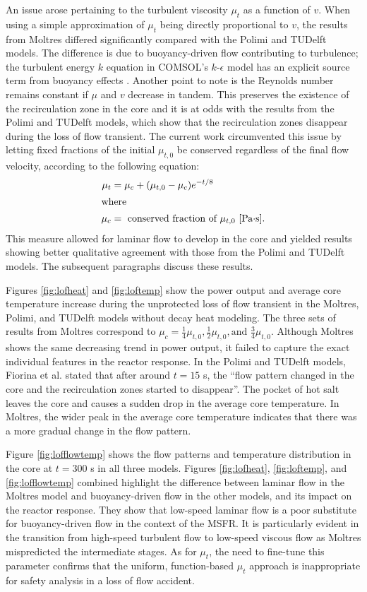 An issue arose pertaining to the turbulent viscosity $\mu_t$ as a function of
$v$. When using a simple approximation of $\mu_t$ being directly proportional
to $v$, the results from Moltres differed significantly compared with the
Polimi and TUDelft models. The difference is due to buoyancy-driven flow
contributing to turbulence; the turbulent energy $k$ equation in COMSOL's
$k$-$\epsilon$ model has an explicit source term from buoyancy effects
\cite{comsol_ab_comsol_2018}. Another point to note is the
Reynolds number remains constant if $\mu$ and $v$ decrease in tandem. This
preserves the existence of the recirculation zone in the core and it is at
odds with the results from the Polimi and TUDelft models, which show that the
recirculation zones disappear during the loss of flow transient. The current
work circumvented this issue by letting fixed fractions of the initial
$\mu_{t,0}$ be conserved regardless of the final flow velocity, according to
the following equation:
%
\begin{align}
    \mu_t &= \mu_c + (\mu_{t,0} - \mu_c) e^{-t/8} \label{lofmu} \\
    \intertext{where}
    \mu_c &= \text{ conserved fraction of $\mu_{t,0}$ [Pa$\cdot$s].} \nonumber
\end{align}
%
This measure allowed for laminar flow to develop in the core and yielded
results showing better qualitative agreement with those from the Polimi and
TUDelft models. The subsequent paragraphs discuss these results.

Figures \ref{fig:lofheat} and \ref{fig:loftemp} show the power output and
average core temperature increase during the unprotected loss of flow
transient in the Moltres, Polimi, and TUDelft models without decay heat
modeling. The three sets of results from Moltres correspond to $\mu_c =
\frac{1}{4} \mu_{t,0}, \frac{1}{2} \mu_{t,0}, \text{and } \frac{3}{4}
\mu_{t,0}$.
Although Moltres shows the same decreasing trend in power output, it failed to
capture the exact individual features in the reactor response. In the Polimi 
and TUDelft models, Fiorina et al. \cite{fiorina_modelling_2014}
stated that after around $t=15$ s, the ``flow pattern changed in the core and
the recirculation zones started to disappear''. The pocket of hot salt leaves
the core and causes a sudden drop in the average core temperature. In Moltres,
the wider peak in the average core temperature
indicates that there was a more gradual change in the flow pattern.

Figure \ref{fig:lofflowtemp} shows the flow patterns and temperature
distribution in the core at $t=300$ s in all three models. Figures
\ref{fig:lofheat}, \ref{fig:loftemp}, and \ref{fig:lofflowtemp} combined
highlight the difference between laminar flow in the Moltres model and
buoyancy-driven flow in the other models, and its impact on the reactor
response. They show that low-speed laminar flow is a poor substitute for
buoyancy-driven flow in the context of the MSFR. It is particularly evident
in the transition from high-speed turbulent flow to low-speed viscous
flow as Moltres mispredicted the intermediate stages. As for $\mu_t$, the need
to fine-tune this parameter confirms that the uniform, function-based $\mu_t$
approach is inappropriate for safety analysis in a loss of flow accident.

